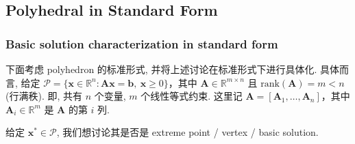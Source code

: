 \subsection{Polyhedral in Standard Form}

\subsubsection{Basic solution characterization in standard form}

下面考虑 polyhedron 的标准形式, 并将上述讨论在标准形式下进行具体化. 具体而言, 给定 $\mathcal{P} = \{\bm{x} \in \mathbb{R}^n: \bm{A}\bm{x} = \bm{b},~ \bm{x} \geq 0\}$，其中 $\bm{A} \in \mathbb{R}^{m \times n}$ 且 $\text{rank}(\bm{A}) = m < n$ (行满秩). 即, 共有 $n$ 个变量, $m$ 个线性等式约束.
这里记 $\bm{A} = [\bm{A}_1, \dots, \bm{A}_n]$，其中 $\bm{A}_i \in \mathbb{R}^m$ 是 $\bm{A}$ 的第 $i$ 列.

给定 $\bm{x}^* \in \mathcal{P}$, 我们想讨论其是否是 extreme point / vertex / basic solution.

